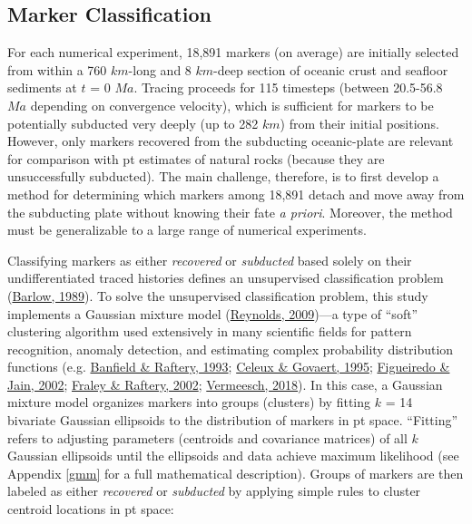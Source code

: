 \hypertarget{marker-classification}{%
\subsection{Marker Classification}\label{marker-classification}}

For each numerical experiment, 18,891 markers (on average) are initially selected from within a 760 \(km\)-long and 8 \(km\)-deep section of oceanic crust and seafloor sediments at \(t\) = 0 \(Ma\). Tracing proceeds for 115 timesteps (between 20.5-56.8 \(Ma\) depending on convergence velocity), which is sufficient for markers to be potentially subducted very deeply (up to 282 \(km\)) from their initial positions. However, only markers recovered from the subducting oceanic-plate are relevant for comparison with \gls{pt} estimates of natural rocks (because they are unsuccessfully subducted). The main challenge, therefore, is to first develop a method for determining which markers among 18,891 detach and move away from the subducting plate without knowing their fate \emph{a priori}. Moreover, the method must be generalizable to a large range of numerical experiments.

Classifying markers as either \emph{recovered} or \emph{subducted} based solely on their undifferentiated traced histories defines an unsupervised classification problem (\protect\hyperlink{ref-barlow1989}{Barlow, 1989}). To solve the unsupervised classification problem, this study implements a Gaussian mixture model (\protect\hyperlink{ref-reynolds2009}{Reynolds, 2009})---a type of ``soft'' clustering algorithm used extensively in many scientific fields for pattern recognition, anomaly detection, and estimating complex probability distribution functions (e.g. \protect\hyperlink{ref-banfield1993}{Banfield \& Raftery, 1993}; \protect\hyperlink{ref-celeux1995}{Celeux \& Govaert, 1995}; \protect\hyperlink{ref-figueiredo2002}{Figueiredo \& Jain, 2002}; \protect\hyperlink{ref-fraley2002}{Fraley \& Raftery, 2002}; \protect\hyperlink{ref-vermeesch2018}{Vermeesch, 2018}). In this case, a Gaussian mixture model organizes markers into groups (clusters) by fitting \(k\) = 14 bivariate Gaussian ellipsoids to the distribution of markers in \gls{pt} space. ``Fitting'' refers to adjusting parameters (centroids and covariance matrices) of all \(k\) Gaussian ellipsoids until the ellipsoids and data achieve maximum likelihood (see Appendix \ref{gmm} for a full mathematical description). Groups of markers are then labeled as either \emph{recovered} or \emph{subducted} by applying simple rules to cluster centroid locations in \gls{pt} space:

